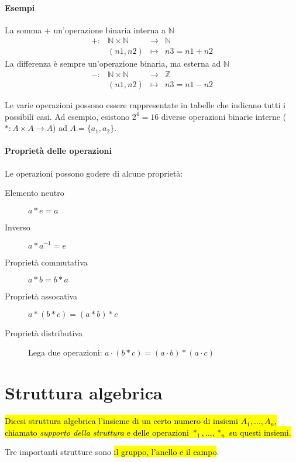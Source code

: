 \paragraph{Esempi}La somma + un'operazione binaria interna a $\mathbb{N}$
\[
    \begin{array}{cccc}
       +: &\mathbb{N} \times \mathbb{N} &\to &\mathbb{N} \\
        &(n1, n2) &\mapsto &n3 = n1 + n2
    \end{array}
\]
La differenza è sempre un'operazione binaria, ma esterna ad $\mathbb{N}$
\[
    \begin{array}{cccc}
        -: &\mathbb{N} \times \mathbb{N} &\to &\mathbb{Z} \\
        &(n1, n2) &\mapsto &n3 = n1 - n2
    \end{array}
\]

Le varie operazioni possono essere rappresentate in tabelle che indicano tutti i
possibili casi. Ad esempio, esistono $2^4 = 16$ diverse operazioni binarie
interne ($\ast: A \times A \to A$) ad $A = \{a_1, a_2\}$.

\paragraph{Proprietà delle operazioni} Le operazioni possono godere di alcune
proprietà:
\begin{description}
    \item[Elemento neutro] $a \ast e = a$
    \item[Inverso] $a \ast a^{-1} = e$
    \item[Proprietà commutativa] $a \ast b = b \ast a$
    \item[Proprietà assocativa] $a \ast (b \ast c) = (a \ast b) \ast c$
    \item[Proprietà distributiva] Lega due operazioni:
        $a \cdot (b \ast c) = (a \cdot b) \ast (a \cdot c)$
\end{description}

\section{Struttura algebrica}
\hl{Dicesi struttura algebrica l'insieme di un certo numero di insiemi
$A_1, \ldots, A_n$, chiamato \textit{supporto della struttura} e delle
operazioni $\ast_1, \ldots, \ast_n$ su questi insiemi.}

Tre importanti strutture sono \hl{il gruppo, l'anello e il campo}.


